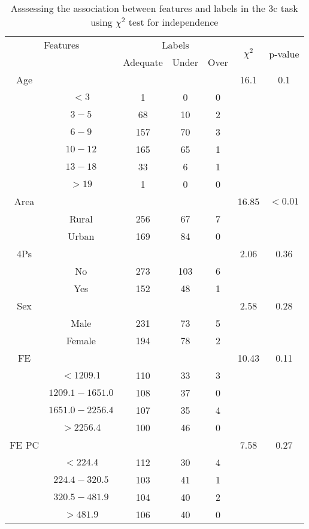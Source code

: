 \begin{table}[!htb]
\centering
\caption{Asssessing the association between features and labels in the 3c task using $\chi^2$ test for independence}
\label{tab:chitest_3c}
\begin{tabular}{c c | c c c| c | c}
\hline
\multicolumn{2}{c|}{Features}& \multicolumn{3}{c|}{Labels}& \multirow{2}{*}{$\chi^2$} & \multirow{2}{*}{p-value}\\ 
& & Adequate & Under & Over & & \\ 
\hline
Age &  &  &  & & 16.1 & 0.1 \\ 
& $< 3$ & 1 & 0 & 0& & \\ 
& $3-5$ & 68 & 10 & 2& & \\ 
& $6-9$ & 157 & 70 & 3& & \\ 
& $10-12$ & 165 & 65 & 1& & \\ 
& $13-18$ & 33 & 6 & 1& & \\ 
& $> 19$ & 1 & 0 & 0& & \\ 
\hline 
Area &  &  &  & & 16.85 & $< 0.01$ \\ 
& Rural & 256 & 67 & 7& & \\ 
& Urban & 169 & 84 & 0& & \\ 
\hline 
4Ps &  &  &  & & 2.06 & 0.36 \\ 
& No & 273 & 103 & 6& & \\ 
& Yes & 152 & 48 & 1& & \\ 
\hline 
Sex &  &  &  & & 2.58 & 0.28 \\ 
& Male & 231 & 73 & 5& & \\ 
& Female & 194 & 78 & 2& & \\ 
\hline 
FE &  &  &  & & 10.43 & 0.11 \\ 
& $< 1209.1$ & 110 & 33 & 3& & \\ 
& $1209.1-1651.0$ & 108 & 37 & 0& & \\ 
& $1651.0-2256.4$ & 107 & 35 & 4& & \\ 
& $> 2256.4$ & 100 & 46 & 0& & \\ 
\hline 
FE PC &  &  &  & & 7.58 & 0.27 \\ 
& $< 224.4$ & 112 & 30 & 4& & \\ 
& $224.4-320.5$ & 103 & 41 & 1& & \\ 
& $320.5-481.9$ & 104 & 40 & 2& & \\ 
& $> 481.9$ & 106 & 40 & 0& & \\ 
\hline 
\end{tabular}
\end{table}
